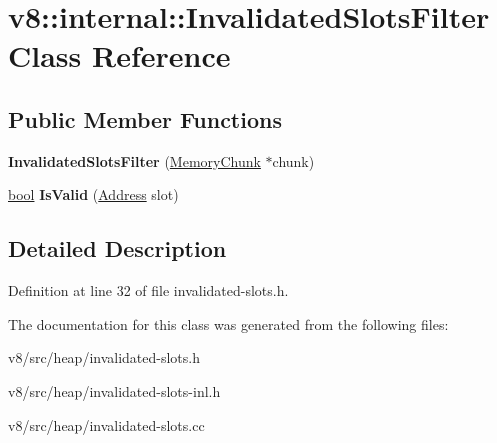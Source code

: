 \hypertarget{classv8_1_1internal_1_1InvalidatedSlotsFilter}{}\section{v8\+:\+:internal\+:\+:Invalidated\+Slots\+Filter Class Reference}
\label{classv8_1_1internal_1_1InvalidatedSlotsFilter}
\subsection*{Public Member Functions}
\begin{DoxyCompactItemize}
\item 
\mbox{\label{classv8_1_1internal_1_1InvalidatedSlotsFilter_a9f831a9e2a2a304eee21907de7f298a5}} 
{\bfseries Invalidated\+Slots\+Filter} (\mbox{\hyperlink{classv8_1_1internal_1_1MemoryChunk}{Memory\+Chunk}} $\ast$chunk)
\item 
\mbox{\label{classv8_1_1internal_1_1InvalidatedSlotsFilter_a416d3cd98af83b2c70125c627533538d}} 
\mbox{\hyperlink{classbool}{bool}} {\bfseries Is\+Valid} (\mbox{\hyperlink{classuintptr__t}{Address}} slot)
\end{DoxyCompactItemize}


\subsection{Detailed Description}


Definition at line 32 of file invalidated-\/slots.\+h.



The documentation for this class was generated from the following files\+:\begin{DoxyCompactItemize}
\item 
v8/src/heap/invalidated-\/slots.\+h\item 
v8/src/heap/invalidated-\/slots-\/inl.\+h\item 
v8/src/heap/invalidated-\/slots.\+cc\end{DoxyCompactItemize}
